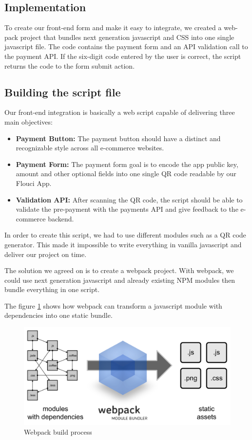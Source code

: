\begin{spacing}{1.2}
\subsection{Implementation}
To create our front-end form and make it easy to integrate, we created a web-pack project that bundles next generation javascript and CSS into one single javascript file.
The code contains the payment form and an API validation call to the payment API.
If the six-digit code entered by the user is correct, the script returns the code to the form submit action.
\subsection{Building the script file}
Our front-end integration is basically a web script capable of delivering three main objectives:
\begin{itemize}
	\item \textbf{Payment Button:} The payment button should have a distinct and recognizable style across all e-commerce websites.
	\item \textbf{Payment Form:} The payment form goal is to encode the app public key, amount and other optional fields into one single QR code readable by our Flouci App.
	\item \textbf{Validation API:} After scanning the QR code, the script should be able to validate the pre-payment with the payments API and give feedback to the e-commerce backend.
\end{itemize}

In order to create this script, we had to use different modules such as a QR code generator. This made it impossible to write everything in vanilla javascript and deliver our project on time. 


The solution we agreed on is to create a webpack project. With webpack, we could use next generation javascript and already existing NPM modules then bundle everything in one script. 

The figure \ref{fig:webpack} shows how webpack can transform a javascript module with dependencies into one static bundle.
\begin{figure}[H]\centering
\includegraphics[width=\textwidth, keepaspectratio ]{webpack.png}
\caption{Webpack build process}
\label{fig:webpack}
\end{figure}


\end{spacing}
